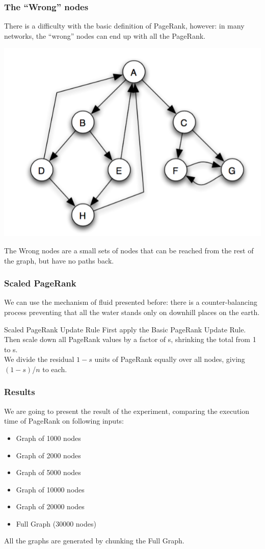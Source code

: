 \documentclass{beamer}
\begin{document}
\begin{frame}
\frametitle{The ``Wrong'' nodes}
There is a difficulty with the basic definition of PageRank, however: in many networks, the “wrong” nodes can end up with all the PageRank.
\begin{center} 
\includegraphics[scale=0.2]{img/wrong_nodes.png} 
\end{center}
The Wrong nodes are a small sets of nodes that can be reached from the rest of the graph, but have no paths back.
\end{frame}

\begin{frame}
\frametitle{Scaled PageRank }
We can use the mechanism of fluid presented before: there is a \alert{counter-balancing process} preventing that all the water stands only on downhill places on the earth.
\begin{block}{Scaled PageRank Update Rule}
First apply the Basic PageRank Update Rule.\\ 
\smallskip
Then scale down all PageRank values by a factor of s, shrinking the total from 1 to s. \\
\smallskip
We divide the residual $1 - s$ units of PageRank equally over all nodes, giving$ (1 - s)$/$n$ to each.
\end{block}
\end{frame}

\begin{frame}
\frametitle{Results}
We are going to present the result of the experiment, comparing the \alert{execution time} of PageRank on following inputs:
\begin{itemize}
\item Graph of 1000 nodes
\item Graph of 2000 nodes
\item Graph of 5000 nodes
\item Graph of 10000 nodes
\item Graph of 20000 nodes
\item Full Graph (30000 nodes) 
\end{itemize}
All the graphs are generated by chunking the Full Graph.
\end{frame}
\end{document}
